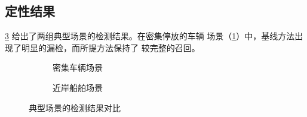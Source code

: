 \subsection{定性结果}
\label{sec:exp:qualitative}

\cref{fig:qualitative} 给出了两组典型场景的检测结果。在密集停放的车辆
场景（\cref{fig:qual-a}）中，基线方法出现了明显的漏检，而所提方法保持了
较完整的召回。

\begin{figure}[htbp]
  \centering
  \begin{subfigure}[b]{0.47\linewidth}
    \centering
    \caption{密集车辆场景}
    \label{fig:qual-a}
  \end{subfigure}
  \hfill
  \begin{subfigure}[b]{0.47\linewidth}
    \centering
    \caption{近岸船舶场景}
    \label{fig:qual-b}
  \end{subfigure}
  \caption{典型场景的检测结果对比}
  \label{fig:qualitative}
\end{figure}
